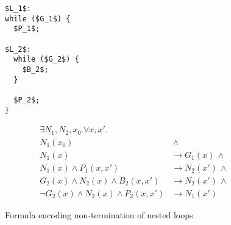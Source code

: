\documentclass[a4paper]{llncs}
\begin{document}



\begin{figure*}
\begin{framed}
\begin{minipage}{0.2\textwidth}
\begin{lstlisting}[mathescape=true,basicstyle=\tiny]
$L_1$:
while ($G_1$) {
  $P_1$;

$L_2$:
  while ($G_2$) {
    $B_2$;
  }

  $P_2$;
}
\end{lstlisting}
\end{minipage}
\vline
\begin{minipage}{0.8\textwidth}
\begin{align*}
 \exists N_1, N_2, x_0 . \forall x, x' . \\
  N_1(x_0) & \, \wedge \\
  N_1(x) & \rightarrow G_1(x) \, \wedge \\
  N_1(x) \wedge P_1(x,x') & \rightarrow N_2(x') \, \wedge \\
  G_2(x) \wedge N_2(x) \wedge B_2(x,x') & \rightarrow N_2(x') \, \wedge \\
  \lnot G_2(x) \wedge N_2(x) \wedge P_2(x,x') & \rightarrow N_1(x') 
\end{align*}
\end{minipage}
\end{framed}

\caption{Formula encoding non-termination of nested loops \label{fig:nonterm-nested}}
\end{figure*}
\end{document}
